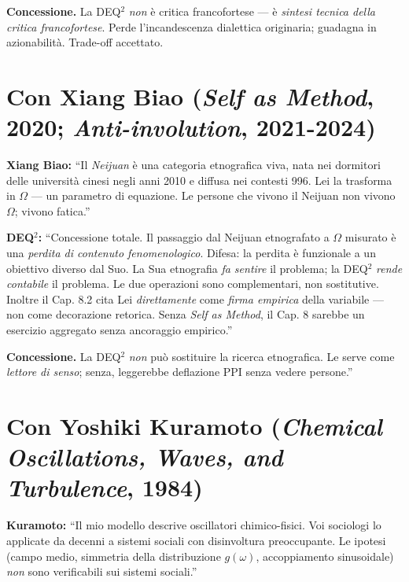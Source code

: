 \textbf{Concessione.} La DEQ$^2$ \emph{non} è critica francofortese --- è
\emph{sintesi tecnica della critica francofortese}. Perde
l'incandescenza dialettica originaria; guadagna in azionabilità.
Trade-off accettato.



\section{\texorpdfstring{Con Xiang Biao (\emph{Self as Method}, 2020;
\emph{Anti-involution},
2021-2024)}{Con Xiang Biao (Self as Method, 2020; Anti-involution, 2021-2024)}}\label{con-xiang-biao-self-as-method-2020-anti-involution-2021-2024}

\textbf{Xiang Biao:} ``Il \emph{Neijuan} è una categoria etnografica
viva, nata nei dormitori delle università cinesi negli anni 2010 e
diffusa nei contesti 996. Lei la trasforma in \(\Omega\) --- un
parametro di equazione. Le persone che vivono il Neijuan non vivono
\(\Omega\); vivono fatica.''

\textbf{DEQ$^2$:} ``Concessione totale. Il passaggio dal Neijuan
etnografato a \(\Omega\) misurato è una \emph{perdita di contenuto
fenomenologico}. Difesa: la perdita è funzionale a un obiettivo diverso
dal Suo. La Sua etnografia \emph{fa sentire} il problema; la DEQ$^2$
\emph{rende contabile} il problema. Le due operazioni sono
complementari, non sostitutive. Inoltre il Cap. 8.2 cita Lei
\emph{direttamente} come \emph{firma empirica} della variabile --- non
come decorazione retorica. Senza \emph{Self as Method}, il Cap. 8
sarebbe un esercizio aggregato senza ancoraggio empirico.''

\textbf{Concessione.} La DEQ$^2$ \emph{non} può sostituire la ricerca
etnografica. Le serve come \emph{lettore di senso}; senza, leggerebbe
deflazione PPI senza vedere persone.''



\section{\texorpdfstring{Con Yoshiki Kuramoto (\emph{Chemical
Oscillations, Waves, and Turbulence},
1984)}{Con Yoshiki Kuramoto (Chemical Oscillations, Waves, and Turbulence, 1984)}}\label{con-yoshiki-kuramoto-chemical-oscillations-waves-and-turbulence-1984}

\textbf{Kuramoto:} ``Il mio modello descrive oscillatori chimico-fisici.
Voi sociologi lo applicate da decenni a sistemi sociali con disinvoltura
preoccupante. Le ipotesi (campo medio, simmetria della distribuzione
\(g(\omega)\), accoppiamento sinusoidale) \emph{non} sono verificabili
sui sistemi sociali.''

